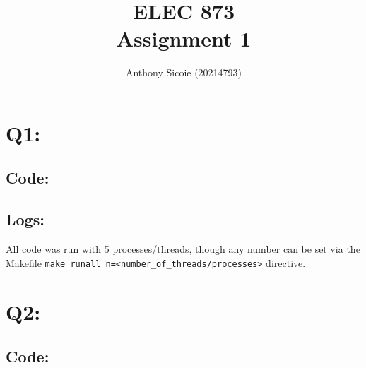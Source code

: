 \documentclass[11pt]{article}
\title{%
  ELEC 873 \\
Assignment 1}
\author{Anthony Sicoie (20214793)}
\begin{document}
\maketitle


\section*{Q1:}

\subsection*{Code:}




\subsection*{Logs:}
All code was run with 5 processes/threads, though any number can be set via the Makefile \texttt{make runall n=<number\_of\_threads/processes>} directive. 




\section*{Q2:}

\subsection*{Code:}



\end{document}
